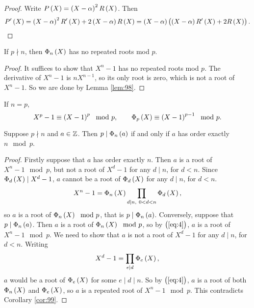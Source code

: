 \begin{proof}
Write $ P\br{X} = \br{X - \alpha}^2R\br{X} $. Then
$$ P'\br{X} = \br{X - \alpha}^2R'\br{X} + 2\br{X - \alpha}R\br{X} = \br{X - \alpha}\br{\br{X - \alpha}R'\br{X} + 2R\br{X}}. $$
\end{proof}

\begin{corollary}
\label{cor:99}
If $ p \nmid n $, then $ \Phi_n\br{X} $ has no repeated roots mod $ p $.
\end{corollary}

\begin{proof}
It suffices to show that $ X^n - 1 $ has no repeated roots mod $ p $. The derivative of $ X^n - 1 $ is $ nX^{n - 1} $, so its only root is zero, which is not a root of $ X^n - 1 $. So we are done by Lemma \ref{lem:98}.
\end{proof}

\begin{note*}
If $ n = p $,
$$ X^p - 1 \equiv \br{X - 1}^p \mod p, \qquad \Phi_p\br{X} \equiv \br{X - 1}^{p - 1} \mod p. $$
\end{note*}

\pagebreak

\begin{theorem}
\label{thm:100}
Suppose $ p \nmid n $ and $ a \in \mathbb{Z} $. Then $ p \mid \Phi_n\br{a} $ if and only if $ a $ has order exactly $ n \mod p $.
\end{theorem}

\begin{proof}
Firstly suppose that $ a $ has order exactly $ n $. Then $ a $ is a root of $ X^n - 1 \mod p $, but not a root of $ X^d - 1 $ for any $ d \mid n $, for $ d < n $. Since $ \Phi_d\br{X} \mid X^d - 1 $, $ a $ cannot be a root of $ \Phi_d\br{X} $ for any $ d \mid n $, for $ d < n $.
\begin{equation}
\label{eq:4}
X^n - 1 = \Phi_n\br{X}\prod_{d \mid n, \ 0 < d < n} \Phi_d\br{X},
\end{equation}
so $ a $ is a root of $ \Phi_n\br{X} \mod p $, that is $ p \mid \Phi_n\br{a} $. Conversely, suppose that $ p \mid \Phi_n\br{a} $. Then $ a $ is a root of $ \Phi_n\br{X} \mod p $, so by $ \br{\ref{eq:4}} $, $ a $ is a root of $ X^n - 1 \mod p $. We need to show that $ a $ is not a root of $ X^d - 1 $ for any $ d \mid n $, for $ d < n $. Writing
$$ X^d - 1 = \prod_{e \mid d} \Phi_e\br{X}, $$
$ a $ would be a root of $ \Phi_e\br{X} $ for some $ e \mid d \mid n $. So by $ \br{\ref{eq:4}} $, $ a $ is a root of both $ \Phi_n\br{X} $ and $ \Phi_e\br{X} $, so $ a $ is a repeated root of $ X^n - 1 \mod p $. This contradicts Corollary \ref{cor:99}.
\end{proof}

